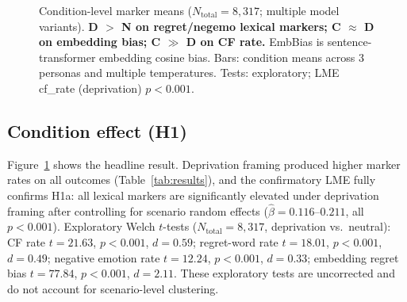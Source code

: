 \documentclass[conference,10pt]{IEEEtran}
\begin{document}
\begin{figure}[t]
\centering
{}
\caption{Condition-level marker means ($N_\text{total}=8{,}317$; multiple model variants). \textbf{D $>$ N on regret/negemo lexical markers; C $\approx$ D on embedding bias; C $\gg$ D on CF rate.} EmbBias is sentence-transformer embedding cosine bias. Bars: condition means across 3 personas and multiple temperatures. Tests: exploratory; LME cf\_rate (deprivation) $p<0.001$.}
\label{fig:main_result}
\end{figure}

\subsection{Condition effect (H1)}

Figure~\ref{fig:main_result} shows the headline result. Deprivation framing produced higher marker rates on all outcomes (Table~\ref{tab:results}), and the confirmatory LME fully confirms H1a: all lexical markers are significantly elevated under deprivation framing after controlling for scenario random effects ($\hat{\beta}=0.116$--$0.211$, all $p<0.001$).
Exploratory Welch $t$-tests ($N_\text{total}=8{,}317$, deprivation vs.\ neutral): CF rate $t=21.63$, $p<0.001$, $d=0.59$; regret-word rate $t=18.01$, $p<0.001$, $d=0.49$; negative emotion rate $t=12.24$, $p<0.001$, $d=0.33$; embedding regret bias $t=77.84$, $p<0.001$, $d=2.11$. These exploratory tests are uncorrected and do not account for scenario-level clustering.
\end{document}
